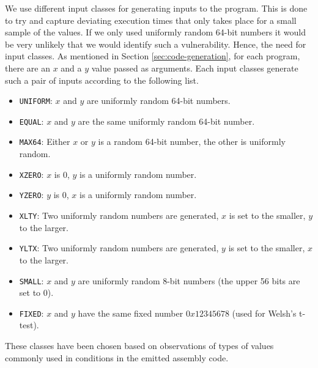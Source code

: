 We use different input classes for generating inputs to the program. 
This is done to try and capture deviating execution times that only takes place for a small sample of the values.
If we only used uniformly random 64-bit numbers it would be very unlikely that we would identify such a vulnerability.
Hence, the need for input classes.
As mentioned in Section \ref{sec:code-generation}, for each program, there are an $x$ and a $y$ value passed as arguments. 
Each input classes generate such a pair of inputs according to the following list.
\begin{itemize}
    \setlength\itemsep{-0.6em}
    \item \texttt{UNIFORM}: $x$ and $y$ are uniformly random 64-bit numbers.
    \item \texttt{EQUAL}:  $x$ and $y$ are the same uniformly random 64-bit number.
    \item \texttt{MAX64}: Either $x$ or $y$ is a random 64-bit number, the other is uniformly random.
    \item \texttt{XZERO}: $x$ is 0, $y$ is a uniformly random number.
    \item \texttt{YZERO}: $y$ is 0, $x$ is a uniformly random number.
    \item \texttt{XLTY}: Two uniformly random numbers are generated, $x$ is set to the smaller, $y$ to the larger.
    \item \texttt{YLTX}: Two uniformly random numbers are generated, $y$ is set to the smaller, $x$ to the larger.
    \item \texttt{SMALL}: $x$ and $y$ are uniformly random 8-bit numbers (the upper 56 bits are set to 0).
    \item \texttt{FIXED}: $x$ and $y$ have the same fixed number $0x12345678$ (used for Welsh's t-test).
\end{itemize}
These classes have been chosen based on observations of types of values commonly used in conditions in the emitted assembly code.

